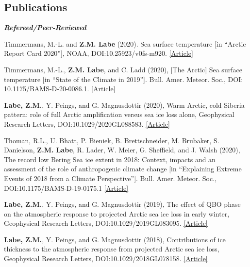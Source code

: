 \documentclass[margin,line,palatino,courier,10pt]{res}
\begin{document}
\begin{resume}
\section{\sc \large{\textcolor{Cerulean}{\textbf{Publications}}}}
\textit{\textbf{Refereed/Peer-Reviewed}}
\vspace*{-0.1in}\\
\begin{etaremune}[leftmargin=0in,topsep=0in,parsep=0in]
\item Timmermans, M.-L. and \textbf{Z.M. Labe} (2020). Sea surface temperature [in ``Arctic Report Card 2020''], NOAA, DOI:10.25923/v0fs-m920. \href{https://arctic.noaa.gov/Report-Card/Report-Card-2020/ArtMID/7975/ArticleID/885/Sea-Surface-Temperature}{[Article]}
\item Timmermans, M.-L., \textbf{Z.M. Labe}, and C. Ladd (2020), [The Arctic] Sea surface temperature [in ``State of the Climate in 2019'']. Bull. Amer. Meteor. Soc., DOI: 10.1175/BAMS-D-20-0086.1. \href{https://journals.ametsoc.org/bams/article/101/8/S239/353884/The-Arctic}{[Article]}
\item \textbf{Labe, Z.M.}, Y. Peings, and G. Magnusdottir (2020), Warm Arctic, cold Siberia pattern: role of full Arctic amplification versus sea ice loss alone, Geophysical Research Letters, DOI:10.1029/2020GL088583. \href{https://agupubs.onlinelibrary.wiley.com/doi/10.1029/2020GL088583}{[Article]}
\item Thoman, R.L., U. Bhatt, P. Bieniek, B. Brettschneider, M. Brubaker, S. Danielson, \textbf{Z.M. Labe}, R. Lader, W. Meier, G. Sheffield, and J. Walsh (2020), The record low Bering Sea ice extent in 2018: Context, impacts and an assessment of the role of anthropogenic climate change [in ``Explaining Extreme Events of 2018 from a Climate Perspective'']. Bull. Amer. Meteor. Soc., DOI:10.1175/BAMS-D-19-0175.1 \href{https://journals.ametsoc.org/doi/abs/10.1175/BAMS-D-19-0175.1}{[Article]}
\item \textbf{Labe, Z.M.}, Y. Peings, and G. Magnusdottir (2019), The effect of QBO phase on the atmospheric response to projected Arctic sea ice loss in early winter, Geophysical Research Letters, DOI:10.1029/2019GL083095. \href{https://agupubs.onlinelibrary.wiley.com/doi/10.1029/2019GL083095}{[Article]}
\item \textbf{Labe, Z.M.}, Y. Peings, and G. Magnusdottir (2018), Contributions of ice thickness to the atmospheric response from projected Arctic sea ice loss, Geophysical Research Letters, DOI:10.1029/2018GL078158. \href{https://agupubs.onlinelibrary.wiley.com/doi/10.1029/2018GL078158}{[Article]}

\end{etaremune}
\end{resume}
\end{document}
